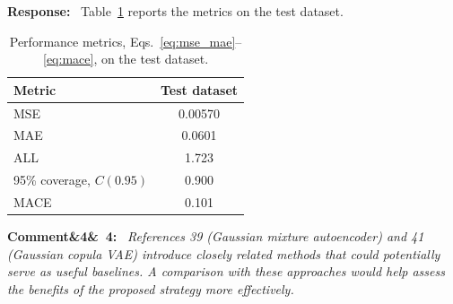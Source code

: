 \documentclass[11pt]{article}
\newenvironment{rcomment}[1]{\par\bigskip\noindent\textbf{Comment\ifx&#1&\else\ #1\fi:}\ \itshape}{\par}
\newenvironment{response}{\par\smallskip\noindent\color{resp}\textbf{Response:}\ }{\par}
\begin{document}
\begin{response}
Table~\ref{tab:metricsB} reports the metrics on the test dataset. 
	
	\begin{table}[H]
		\centering\small
		\caption{Performance metrics, Eqs.~\eqref{eq:mse_mae}--\eqref{eq:mace}, on the test dataset.}
		\label{tab:metricsB}
		\begin{tabular}{lc}
			\toprule
			Metric & Test dataset \\
			\midrule
			MSE & 0.00570 \\
			MAE & 0.0601 \\
			ALL & 1.723 \\
			95\% coverage, $C(0.95)$ & 0.900 \\
			MACE & 0.101 \\
			\bottomrule
		\end{tabular}
	\end{table}
\end{response}


%

\begin{rcomment}{4}
References 39 (Gaussian mixture autoencoder) and 41 (Gaussian copula VAE) introduce closely related methods that could
potentially serve as useful baselines. A comparison with these approaches would help assess the benefits of the proposed
strategy more effectively.
\end{rcomment}
\end{document}
